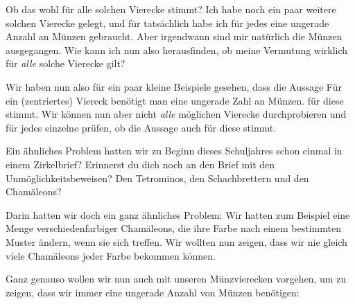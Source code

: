 \documentclass[a4paper,ngerman,12pt]{scrartcl}
\theoremstyle{definition}
\theoremstyle{plain}
\theoremstyle{remark}
\begin{document}
Ob das wohl für alle solchen Vierecke stimmt? Ich habe noch ein paar weitere solchen Vierecke gelegt, und für tatsächlich habe ich für jedes eine ungerade Anzahl an Münzen gebraucht. Aber irgendwann sind mir natürlich die Münzen ausgegangen. Wie kann ich nun also herausfinden, ob meine Vermutung wirklich für \emph{alle} solche Vierecke gilt?

Wir haben nun also für ein paar kleine Beispiele gesehen, dass die Aussage \glqq Für ein (zentriertes) Viereck benötigt man eine ungerade Zahl an Münzen.\grqq{} für diese stimmt. Wir können nun aber nicht \emph{alle} möglichen Vierecke durchprobieren und für jedes einzelne prüfen, ob die Aussage auch für diese stimmt.

Ein ähnliches Problem hatten wir zu Beginn dieses Schuljahres schon einmal in einem Zirkelbrief? Erinnerst du dich noch an den Brief mit den Unmöglichkeitsbeweisen? Den Tetrominos, den Schachbrettern und den Chamäleons? 


Darin hatten wir doch ein ganz ähnliches Problem: Wir hatten zum Beispiel eine Menge verschiedenfarbiger Chamäleons, die ihre Farbe nach einem bestimmten Muster ändern, wenn sie sich treffen. Wir wollten nun zeigen, dass wir nie gleich viele Chamäleons jeder Farbe bekommen können.


Ganz genauso wollen wir nun auch mit unseren Münzvierecken vorgehen, um zu zeigen, dass wir immer eine ungerade Anzahl von Münzen benötigen:
\end{document}
